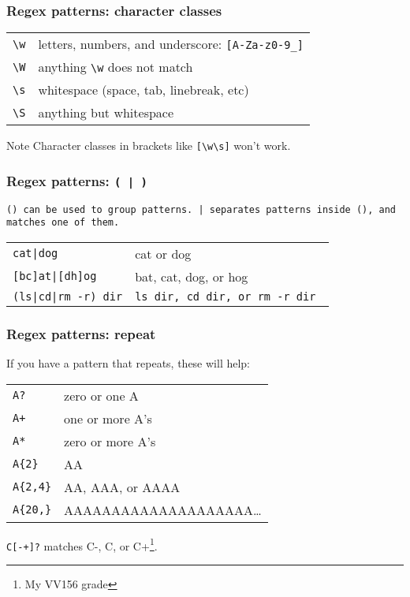 \begin{frame}[fragile]
\frametitle{Regex patterns: character classes}
\begin{table}
    \centering
    \begin{tabular}{ll}
        \verb|\w|           & letters, numbers, and underscore:
                              \verb|[A-Za-z0-9_]| \\
        \verb|\W|           & anything \verb|\w| does not match \\
        \verb|\s|           & whitespace (space, tab, linebreak, etc) \\
        \verb|\S|           & anything but whitespace \\
    \end{tabular}
\end{table}

\begin{block}{Note}
    Character classes in brackets like \verb|[\w\s]| won't work.
\end{block}
\end{frame}

\begin{frame}[fragile]
\frametitle{Regex patterns: \tt{( | )}}
\tt{()} can be used to group patterns.
\tt{|} separates patterns inside \tt{()}, and matches one of them.
\begin{table}
    \centering
    \begin{tabular}{ll}
        \verb!cat|dog!              & cat or dog \\
        \verb![bc]at|[dh]og!        & bat, cat, dog, or hog \\
        \verb!(ls|cd|rm -r) dir!    & \tt{ls dir}, \tt{cd dir}, or \tt{rm -r dir} \\
    \end{tabular}
\end{table}
\end{frame}

\begin{frame}[fragile]
\frametitle{Regex patterns: repeat}
If you have a pattern that repeats, these will help:
\begin{table}
    \centering
    \begin{tabular}{ll}
        \verb|A?|           & zero or one A \\
        \verb|A+|           & one or more A's \\  %
        \verb|A*|           & zero or more A's \\ %
        \verb|A{2}|         & AA \\
        \verb|A{2,4}|       & AA, AAA, or AAAA \\
        \verb|A{20,}|       & AAAAAAAAAAAAAAAAAAAA… \\
    \end{tabular}
\end{table}

\begin{example}
    \verb|C[-+]?| matches C-, C, or C+\footnote{My VV156 grade}.
\end{example}
\end{frame}

